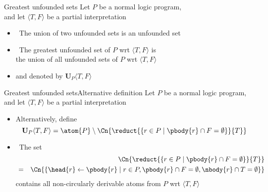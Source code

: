 \begin{frame}{Greatest unfounded sets}{\phantom{Alternative definition}}\label{unf:greatest}
  Let $P$ be a normal logic program,\\ and let
  $\langle T,F \rangle$ be a partial interpretation
  \medskip
  \begin{itemize}
  \item<2->  \ The union of two unfounded sets is an unfounded set
    \medskip
  \item<3->   \ The \alert{greatest unfounded set} of $P$ wrt $\langle T,F \rangle$ is
    \\ the union of all unfounded sets of $P$ wrt $\langle T,F \rangle$
  \item<4-> [] and denoted by $\mathbf{U}_P\langle T,F \rangle$
  \end{itemize}
\end{frame}
\begin{frame}{Greatest unfounded sets}{Alternative definition}
  Let $P$ be a normal logic program,\\ and let
  $\langle T,F \rangle$ be a partial interpretation
  \medskip
  \begin{itemize}
  \item<1-> Alternatively, define
    \[
      \mathbf{U}_P\langle T,F \rangle =
      \atom{P} \setminus
      \Cn{\reduct{\{r \in P \mid \pbody{r} \cap F = \emptyset\}}{T}}\/
    \]
  \item<2->  \ The set
    \begin{eqnarray*}
      & & \Cn{\reduct{\{r \in P \mid \pbody{r} \cap F = \emptyset\}}{T}}\\
      &=& \Cn{\{\head{r}\leftarrow\pbody{r} \mid r\in P, \pbody{r} \cap F = \emptyset, \nbody{r}\cap T=\emptyset\}}
    \end{eqnarray*}
    contains all non-circularly derivable atoms from $P$ wrt $\langle T,F \rangle$
  \end{itemize}
\end{frame}
%
